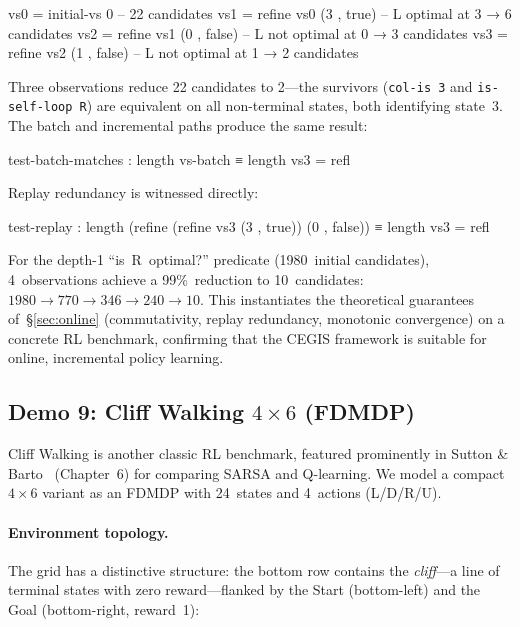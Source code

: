 \begin{spec}
vs0 = initial-vs 0                     -- 22 candidates
vs1 = refine vs0 (3 , true)            -- L optimal at 3  → 6 candidates
vs2 = refine vs1 (0 , false)           -- L not optimal at 0  → 3 candidates
vs3 = refine vs2 (1 , false)           -- L not optimal at 1  → 2 candidates
\end{spec}

\noindent Three observations reduce 22 candidates to 2---the survivors (\texttt{col-is~3} and \texttt{is-self-loop~R}) are equivalent on all non-terminal states, both identifying state~3.  The batch and incremental paths produce the same result:

\begin{spec}
test-batch-matches : length vs-batch ≡ length vs3   = refl
\end{spec}

\noindent Replay redundancy is witnessed directly:

\begin{spec}
test-replay : length (refine (refine vs3 (3 , true)) (0 , false))
            ≡ length vs3   = refl
\end{spec}

\noindent For the depth-1 ``is~R~optimal?'' predicate (1980~initial candidates), 4~observations achieve a 99\%~reduction to 10~candidates: $1980 \to 770 \to 346 \to 240 \to 10$.  This instantiates the theoretical guarantees of~\S\ref{sec:online} (commutativity, replay redundancy, monotonic convergence) on a concrete RL benchmark, confirming that the CEGIS framework is suitable for online, incremental policy learning.

\subsection{Demo 9: Cliff Walking \texorpdfstring{$4 \times 6$}{4x6} (FDMDP)}
\label{sec:e2e-cliffwalk}

Cliff Walking is another classic RL benchmark, featured prominently in Sutton \& Barto~\cite{Sutton2018} (Chapter~6) for comparing SARSA and Q-learning.  We model a compact $4 \times 6$ variant as an FDMDP with 24~states and 4~actions (L/D/R/U).

\paragraph{Environment topology.}
The grid has a distinctive structure: the bottom row contains the \emph{cliff}---a line of terminal states with zero reward---flanked by the Start (bottom-left) and the Goal (bottom-right, reward~1):

